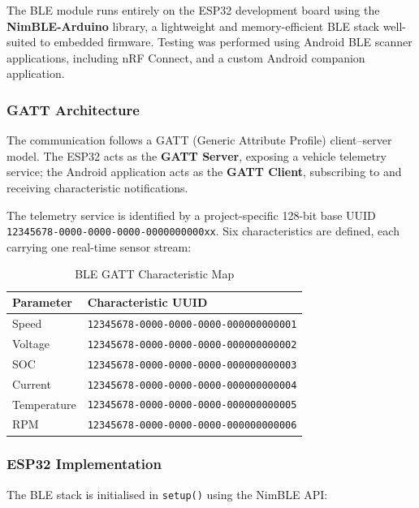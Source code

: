 The BLE module runs entirely on the ESP32 development board using the \textbf{NimBLE-Arduino} library, a lightweight and memory-efficient BLE stack well-suited to embedded firmware. Testing was performed using Android BLE scanner applications, including nRF Connect, and a custom Android companion application.

\subsubsection*{GATT Architecture}

The communication follows a GATT (Generic Attribute Profile) client--server model. The ESP32 acts as the \textbf{GATT Server}, exposing a vehicle telemetry service; the Android application acts as the \textbf{GATT Client}, subscribing to and receiving characteristic notifications.

The telemetry service is identified by a project-specific 128-bit base UUID \texttt{12345678-0000-0000-0000-0000000000xx}. Six characteristics are defined, each carrying one real-time sensor stream:

\begin{table}[H]
\centering
\caption{BLE GATT Characteristic Map}
\label{tab:ble-characteristics}
\begin{tabular}{ll}
\toprule
\textbf{Parameter} & \textbf{Characteristic UUID} \\
\midrule
Speed       & \texttt{12345678-0000-0000-0000-000000000001} \\
Voltage     & \texttt{12345678-0000-0000-0000-000000000002} \\
SOC         & \texttt{12345678-0000-0000-0000-000000000003} \\
Current     & \texttt{12345678-0000-0000-0000-000000000004} \\
Temperature & \texttt{12345678-0000-0000-0000-000000000005} \\
RPM         & \texttt{12345678-0000-0000-0000-000000000006} \\
\bottomrule
\end{tabular}
\end{table}

\subsubsection*{ESP32 Implementation}

The BLE stack is initialised in \texttt{setup()} using the NimBLE API:

